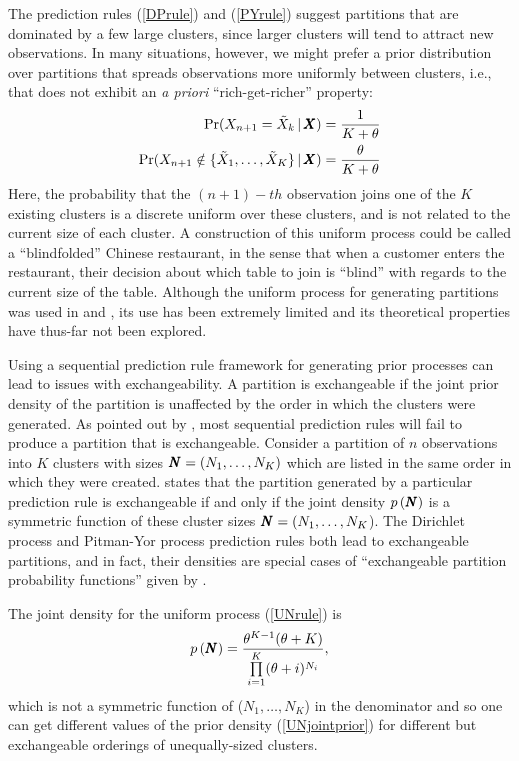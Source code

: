 \documentclass[]{article}
\begin{document}
The prediction rules (\ref{DPrule}) and (\ref{PYrule}) suggest
partitions that are dominated by a few large clusters, since larger
clusters will tend to attract new observations. In many situations,
however, we might prefer a prior distribution over partitions that
spreads observations more uniformly between clusters, i.e., that does
not exhibit an \emph{a priori} ``rich-get-richer'' property:
\begin{align}
\Pr(X_{n + 1} = \tilde{X}_k \,|\, \pmb{X}) &= \frac{1}{K +
  \theta} \nonumber \\
\Pr(X_{n + 1} \notin \{\tilde{X}_1, \ldots, \tilde{X}_K\} \,|\, \pmb{X}) &=
\frac{\theta}{K + \theta} \label{UNrule}
\end{align}
Here, the probability that the $(n+1)-th$ observation joins one of the
$K$ existing clusters is a discrete uniform over these clusters, and
is not related to the current size of each cluster.  A construction of
this uniform process could be called a ``blindfolded'' Chinese
restaurant, in the sense that when a customer enters the restaurant,
their decision about which table to join is ``blind'' with regards to
the current size of the table.  Although the uniform process for
generating partitions was used in \cite{QinMcCTho03} and
\cite{JenLiu08}, its use has been extremely limited and its theoretical
properties have thus-far not been explored.


Using a sequential prediction rule framework for generating prior
processes can lead to issues with exchangeability.  A partition is exchangeable if the joint prior
density of the partition is unaffected by the order in which the
clusters were generated.  As pointed out by \cite{Pit02}, most
sequential prediction rules will fail to produce a partition that is
exchangeable.  Consider a partition of $n$ observations into $K$
clusters with sizes $\pmb{N} = (N_1, \ldots, N_K)$ which are listed in the
same order in which they were created.   \cite{Pit02} states that the
partition generated by a particular prediction rule is exchangeable if
and only if the joint density $p\,(\pmb{N})$ is a symmetric function of
these cluster sizes $\pmb{N}= (N_1, \ldots, N_K$).   The Dirichlet process and
Pitman-Yor process prediction rules both lead to exchangeable
partitions, and in fact, their densities are special cases of 
``exchangeable partition probability functions'' given by
\cite{IshJam03}.

The joint density for the uniform process (\ref{UNrule}) is
\begin{eqnarray}
p\,(\pmb{N}) = \frac{\theta^{K-1} (\theta+K)}{\prod\limits_{i=1}^K (\theta +
  i)^{N_i}  }, \label{UNjointprior}
\end{eqnarray}
which is not a symmetric function of ($N_1, \ldots, N_K$) in the
denominator and so one can get different values of the
prior density (\ref{UNjointprior}) for different but exchangeable
orderings of unequally-sized clusters.  
\end{document}
